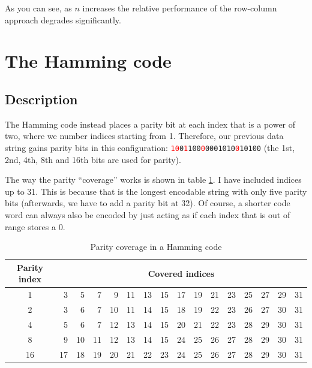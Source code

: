 \documentclass[a4paper,11pt]{article}
\begin{document}
    As you can see, as $n$ increases the relative performance of the row-column
    approach degrades significantly.

    \section{The Hamming code}

    \subsection{Description}

    The Hamming code instead places a parity bit at each index that is a power
    of two, where we number indices starting from 1. Therefore, our previous
    data string gains parity bits in this configuration:
    \texttt{\textcolor{red}{10}0\textcolor{red}{1}100\textcolor{red}{0}0001010\textcolor{red}{0}10100}
    (the 1st, 2nd, 4th, 8th and 16th bits are used for parity).

    The way the parity ``coverage'' works is shown in table
    \ref{tab:hamming-indices}.  I have included indices up to 31. This is
    because that is the longest encodable string with only five parity bits
    (afterwards, we have to add a parity bit at 32). Of course, a shorter code
    word can always also be encoded by just acting as if each index that is out
    of range stores a 0.

\begin{table}[H]
\begin{center}
    \begin{tabular}{crrrrrrrrrrrrrrr}
    \toprule
    Parity index & \multicolumn{15}{c}{Covered indices} \\
    \midrule
    1 & 3 & 5 & 7 & 9 & 11 & 13 & 15 & 17 & 19 & 21 & 23 & 25 & 27 & 29 & 31 \\
    2 & 3 & 6 & 7 & 10 & 11 & 14 & 15 & 18 & 19 & 22 & 23 & 26 & 27 & 30 & 31 \\
    4 & 5 & 6 & 7 & 12 & 13 & 14 & 15 & 20 & 21 & 22 & 23 & 28 & 29 & 30 & 31 \\
    8 & 9 & 10 & 11 & 12 & 13 & 14 & 15 & 24 & 25 & 26 & 27 & 28 & 29 & 30 & 31 \\
    16 & 17 & 18 & 19 & 20 & 21 & 22 & 23 & 24 & 25 & 26 & 27 & 28 & 29 & 30 & 31 \\
    \bottomrule
    \end{tabular}
    \caption{Parity coverage in a Hamming code}\label{tab:hamming-indices}
\end{center}
\end{table}
\end{document}
